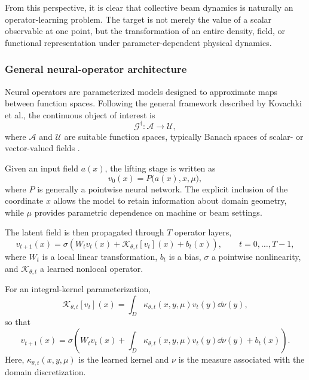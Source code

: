 From this perspective, it is clear that collective beam dynamics is naturally an operator-learning problem. The target is not merely the value of a scalar observable at one point, but the transformation of an entire density, field, or functional representation under parameter-dependent physical dynamics.

\subsubsection{General neural-operator architecture}
\label{subsubsec:general_neural_operator}

Neural operators are parameterized models designed to approximate maps between function spaces. Following the general framework described by Kovachki et al.\cite{kovachki_neural_2023}, the continuous object of interest is
\begin{equation}
\mathcal{G}^{\dagger}
:
\mathcal{A}
\longrightarrow
\mathcal{U},
\end{equation}
where $\mathcal{A}$ and $\mathcal{U}$ are suitable function spaces, typically Banach spaces of scalar- or vector-valued fields \cite{kovachki_neural_2023}.

Given an input field $a(x)$, the lifting stage is written as
\begin{equation}
v_0(x)
=
P
\bigl(
a(x),
x,
\mu
\bigr),
\label{eq:NO_lift}
\end{equation}
where $P$ is generally a pointwise neural network. The explicit inclusion of the coordinate $x$ allows the model to retain information about domain geometry, while $\mu$ provides parametric dependence on machine or beam settings.

The latent field is then propagated through $T$ operator layers\cite{arpaia_machine_2021},
\begin{equation}
v_{t+1}(x)
=
\sigma
\left(
W_t v_t(x)
+
\mathcal{K}_{\theta,t}[v_t](x)
+
b_t(x)
\right),
\qquad
t=0,\ldots,T-1,
\label{eq:NO_layer_abstract}
\end{equation}
where $W_t$ is a local linear transformation,
$b_t$ is a bias,
$\sigma$ a pointwise nonlinearity,
and $\mathcal{K}_{\theta,t}$ a learned nonlocal operator.

For an integral-kernel parameterization,
\begin{equation}
\mathcal{K}_{\theta,t}[v_t](x)
=
\int_D
\kappa_{\theta,t}
(x,y,\mu)
v_t(y)
\dd\nu(y),
\label{eq:NO_kernel_operator}
\end{equation}
so that
\begin{equation}
v_{t+1}(x)
=
\sigma
\left(
W_t v_t(x)
+
\int_D
\kappa_{\theta,t}(x,y,\mu)
v_t(y)
\dd\nu(y)
+
b_t(x)
\right).
\label{eq:NO_layer_full}
\end{equation}
Here, $\kappa_{\theta,t}(x,y,\mu)$ is the learned kernel and $\nu$ is the measure associated with the domain discretization.

